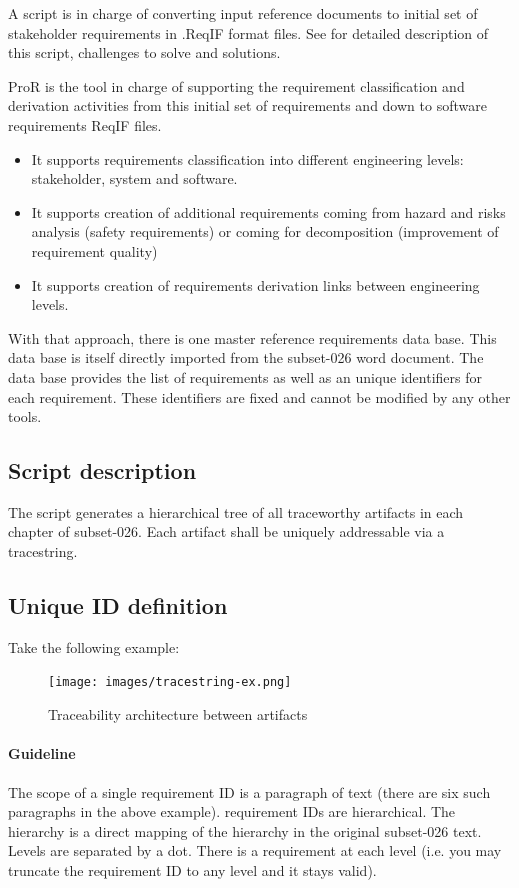 \documentclass[11pt]{template/openetcs_report}
\begin{document}
A script is in charge of converting input reference documents to initial set of stakeholder requirements in .ReqIF format files. See \label{importScript} for detailed description of this script, challenges to solve and solutions.

ProR is the tool in charge of supporting the requirement classification and derivation activities from this initial set of requirements and down to software requirements ReqIF files. 
\begin{itemize} 
\item It supports requirements classification into different engineering levels: stakeholder, system and software.
\item It supports creation of additional requirements coming from hazard and risks analysis (safety requirements) or coming for decomposition (improvement of requirement quality)
\item It supports creation of requirements derivation links between engineering levels.
\end{itemize}


With that approach, there is one master reference requirements data base. This data
base is itself directly imported from the subset-026 word document. The data
base provides the list of requirements as well as an unique identifiers for each
requirement. These identifiers are fixed and cannot be modified by any other
tools. 


\subsection{Script description}
\label{importScript}
The script  generates a hierarchical tree of all traceworthy
artifacts in each chapter of subset-026. Each artifact shall be uniquely
addressable via a tracestring.


\subsection{Unique ID definition}
\label{sec-5-1-2}
Take the following example:
\begin{figure}[htb]
\centering
\texttt{[image: images/tracestring-ex.png]}
\caption{\label{fig:reqID_ex}Traceability architecture between artifacts}
\end{figure}


\paragraph{Guideline}
The scope of a single requirement ID is a paragraph of text (there are six such
paragraphs in the above example).  requirement IDs are hierarchical. The
hierarchy is a direct mapping of the hierarchy in the original subset-026
text. Levels are separated by a dot. There is a requirement at each level
(i.e. you may truncate the requirement ID to any level and it stays valid).
\end{document}
